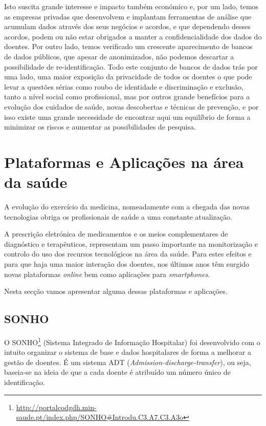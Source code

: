 \documentclass[conference]{IEEEtran}
\begin{document}
Isto suscita grande interesse e impacto também económico e, por um lado, temos as empresas privadas que desenvolvem e implantam ferramentas de análise que acumulam dados através dos seus negócios e acordos, e que dependendo desses acordos, podem ou não estar obrigados a manter a confidencialidade dos dados do doentes. Por outro lado, temos verificado um crescente aparecimento de bancos de dados públicos, que apesar de anonimizados, não podemos descartar a possibilidade de re-identificação. Todo este conjunto de bancos de dados trás por uma lado, uma maior exposição da privacidade de todos os doentes o que pode levar a questões sérias como roubo de identidade e discriminação e exclusão, tanto a nível social como profissional, mas por outros grande benefícios para a evolução dos cuidados de saúde, novas descobertas e técnicas de prevenção, e por isso existe uma grande necessidade de encontrar aqui um equilíbrio de forma a minimizar os riscos e aumentar as possibilidades de pesquisa.


\section{Plataformas e Aplicações na área da saúde}

A evolução do exercício da medicina, nomeadamente com a chegada das novas tecnologias obriga os profissionais de saúde a uma constante atualização.

A prescrição eletrónica de medicamentos e os meios complementares de diagnóstico e terapêuticos, representam um passo importante na monitorização e controlo do uso dos recursos tecnológicos na área da saúde. Para estes efeitos e para que haja uma maior interação dos doentes, nos últimos anos têm surgido novas plataformas \textit{online} bem como aplicações para \textit{smartphones}.

Nesta secção vamos apresentar alguma dessas plataformas e aplicações.


\subsection{SONHO}

O SONHO\footnote{\url{http://portalcodgdh.min-saude.pt/index.php/SONHO\#Introdu.C3.A7.C3.A3o}} (Sistema Integrado de Informação Hospitalar) foi desenvolvido com o intuito organizar o sistema de base e dados hospitalares de forma a melhorar a gestão de doentes. É um sistema ADT (\textit{Admission-discharge-transfer}), ou seja, baseia-se na ideia de que a cada doente é atribuído um número único de identificação.
\end{document}
